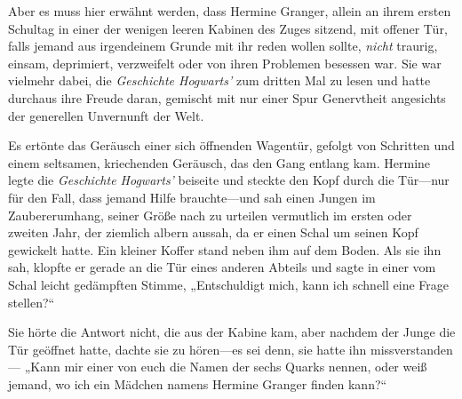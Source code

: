 Aber es muss hier erwähnt werden, dass Hermine Granger, allein an ihrem ersten Schultag in einer der wenigen leeren Kabinen des Zuges sitzend, mit offener Tür, falls jemand aus irgendeinem Grunde mit ihr reden wollen sollte, \emph{nicht} traurig, einsam, deprimiert, verzweifelt oder von ihren Problemen besessen war. Sie war vielmehr dabei, die \emph{Geschichte Hogwarts’} zum dritten Mal zu lesen und hatte durchaus ihre Freude daran, gemischt mit nur einer Spur Genervtheit angesichts der generellen Unvernunft der Welt.

Es ertönte das Geräusch einer sich öffnenden Wagentür, gefolgt von Schritten und einem seltsamen, kriechenden Geräusch, das den Gang entlang kam. Hermine legte die \emph{Geschichte Hogwarts’} beiseite und steckte den Kopf durch die Tür—nur für den Fall, dass jemand Hilfe brauchte—und sah einen Jungen im Zaubererumhang, seiner Größe nach zu urteilen vermutlich im ersten oder zweiten Jahr, der ziemlich albern aussah, da er einen Schal um seinen Kopf gewickelt hatte. Ein kleiner Koffer stand neben ihm auf dem Boden. Als sie ihn sah, klopfte er gerade an die Tür eines anderen Abteils und sagte in einer vom Schal leicht gedämpften Stimme, „Entschuldigt mich, kann ich schnell eine Frage stellen?“

Sie hörte die Antwort nicht, die aus der Kabine kam, aber nachdem der Junge die Tür geöffnet hatte, dachte sie zu hören—es sei denn, sie hatte ihn missverstanden— „Kann mir einer von euch die Namen der sechs Quarks nennen, oder weiß jemand, wo ich ein Mädchen namens Hermine Granger finden kann?“

